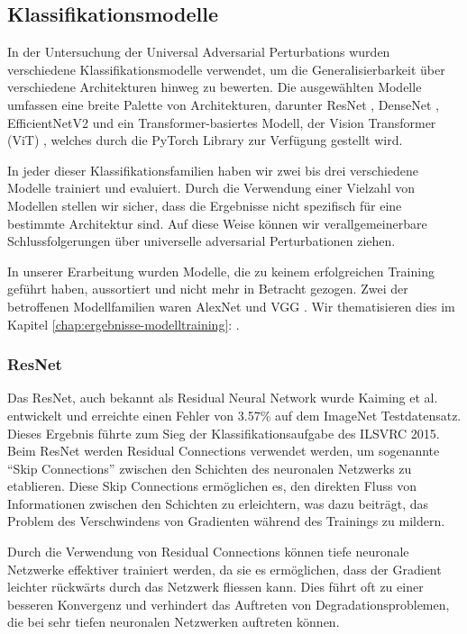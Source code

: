 \subsection{Klassifikationsmodelle} \label{chap:klassifikationsmodelle}

In der Untersuchung der Universal Adversarial Perturbations wurden verschiedene Klassifikationsmodelle verwendet, um die Generalisierbarkeit über verschiedene Architekturen hinweg zu bewerten. Die ausgewählten Modelle umfassen eine breite Palette von Architekturen, darunter ResNet \cite{he_deep_2015}, DenseNet \cite{huang_densely_2018}, EfficientNetV2 \cite{tan_efficientnetv2_2021} und ein Transformer-basiertes Modell, der Vision Transformer (ViT) \cite{dosovitskiy_image_2021}, welches durch die PyTorch Library zur Verfügung gestellt wird.

In jeder dieser Klassifikationsfamilien haben wir zwei bis drei verschiedene Modelle trainiert und evaluiert. Durch die Verwendung einer Vielzahl von Modellen stellen wir sicher, dass die Ergebnisse nicht spezifisch für eine bestimmte Architektur sind. Auf diese Weise können wir verallgemeinerbare Schlussfolgerungen über universelle adversarial Perturbationen ziehen.

In unserer Erarbeitung wurden Modelle, die zu keinem erfolgreichen Training geführt haben, aussortiert und nicht mehr in Betracht gezogen. Zwei der betroffenen Modellfamilien waren AlexNet \cite{krizhevsky_imagenet_2012} und VGG \cite{simonyan_very_2015}. Wir thematisieren dies im Kapitel \ref{chap:ergebnisse-modelltraining}: .

\subsubsection{ResNet}
Das ResNet, auch bekannt als Residual Neural Network wurde Kaiming et al. \cite{he_deep_2015} entwickelt und erreichte einen Fehler von 3.57\% auf dem ImageNet Testdatensatz. Dieses Ergebnis führte zum Sieg der Klassifikationsaufgabe des ILSVRC 2015. Beim ResNet werden Residual Connections verwendet werden, um sogenannte "`Skip Connections"' zwischen den Schichten des neuronalen Netzwerks zu etablieren. Diese Skip Connections ermöglichen es, den direkten Fluss von Informationen zwischen den Schichten zu erleichtern, was dazu beiträgt, das Problem des Verschwindens von Gradienten während des Trainings zu mildern.

Durch die Verwendung von Residual Connections können tiefe neuronale Netzwerke effektiver trainiert werden, da sie es ermöglichen, dass der Gradient leichter rückwärts durch das Netzwerk fliessen kann. Dies führt oft zu einer besseren Konvergenz und verhindert das Auftreten von Degradationsproblemen, die bei sehr tiefen neuronalen Netzwerken auftreten können.

